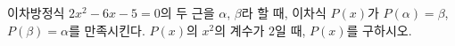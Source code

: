 이차방정식 $2x^2-6x-5=0$의 두 근을 $\alpha$, $\beta$라 할 때, 이차식 $P(x)$가 $P(\alpha)=\beta$, $P(\beta)=\alpha$를 만족시킨다. $P(x)$의 $x^2$의 계수가 $2$일 때, $P(x)$를 구하시오.
